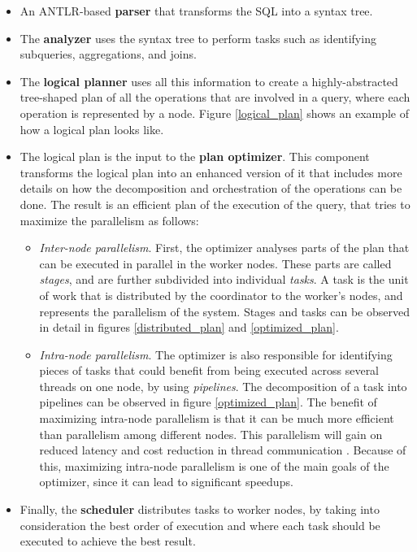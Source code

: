 \documentclass[conference]{IEEEtran}
\begin{document}
\begin{itemize}
    \item An ANTLR-based \textbf{parser} that transforms the SQL into a syntax tree.
    \item The \textbf{analyzer} uses the syntax tree to perform tasks such as identifying subqueries, aggregations, and joins.
    \item The \textbf{logical planner} uses all this information to create a highly-abstracted tree-shaped plan of all the operations that are involved in a query, where each operation is represented by a node. Figure \ref{logical_plan} shows an example of how a logical plan looks like.
    \item The logical plan is the input to the \textbf{plan optimizer}. This component transforms the logical plan into an enhanced version of it that includes more details on how the decomposition and orchestration of the operations can be done. The result is an efficient plan of the execution of the query, that tries to maximize the parallelism as follows:
    \begin{itemize}
        \item \textit{Inter-node parallelism}. First, the optimizer analyses parts of the plan that can be executed in parallel in the worker nodes. These parts are called \textit{stages}, and are further subdivided into individual \textit{tasks}. A task is the unit of work that is distributed by the coordinator to the worker's nodes, and represents the parallelism of the system. Stages and tasks can be observed in detail in figures \ref{distributed_plan} and \ref{optimized_plan}.
        \item \textit{Intra-node parallelism}. The optimizer is also responsible for identifying pieces of tasks that could benefit from being executed across several threads on one node, by using \textit{pipelines}. The decomposition of a task into pipelines can be observed in figure \ref{optimized_plan}. The benefit of maximizing intra-node parallelism is that it can be much more efficient than parallelism among different nodes. This parallelism will gain on reduced latency and cost reduction in thread communication \cite{sethi-2019}. Because of this, maximizing intra-node parallelism is one of the main goals of the optimizer, since it can lead to significant speedups.
    \end{itemize}
    \item Finally, the \textbf{scheduler} distributes tasks to worker nodes, by taking into consideration the best order of execution and where each task should be executed to achieve the best result.
\end{itemize}
\end{document}
